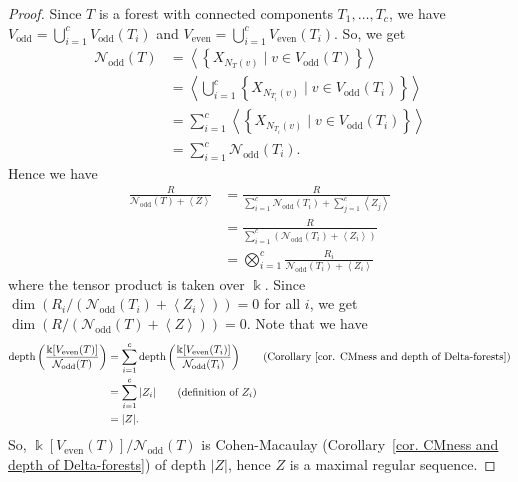 \documentclass[12pt, reqno]{amsart}
\theoremstyle{definition}
\theoremstyle{plain}
\theoremstyle{definition}
\newcommand{\depth}{\mbox{depth}}
\newcommand{\kk}{\Bbbk}
\newcommand\gen[1]{\left\langle #1 \right\rangle}
\newcommand\Set[2]{\left\lbrace #1 \mid #2 \right\rbrace}
\newcommand{\NN}{\mathcal{N}}
\begin{document}
\begin{proof}
Since $T$ is a forest with connected components $T_1,\dots,T_c$, we have $V_{\text{odd}} = \bigcup_{i = 1}^c V_{\text{odd}}(T_i)$ and $V_{\text{even}} = \bigcup_{i = 1}^c V_{\text{even}}(T_i)$.
So, we get
\begin{align*}
    \NN_{\text{odd}}(T) &= \gen{\Set{X_{N_T(v)}}{v \in V_{\text{odd}}(T)}}\\
    &= \gen{\bigcup_{i = 1}^c \Set{X_{N_{T_i}(v)}}{v \in V_{\text{odd}}(T_i)}}\\
    &= \sum_{i = 1}^c \gen{\Set{X_{N_{T_i}(v)}}{v \in V_{\text{odd}}(T_i)}}\\
    &= \sum_{i = 1}^c \NN_{\text{odd}}(T_i).
\end{align*}
Hence we have
\begin{align*}
    \frac{R}{\NN_{\text{odd}}(T)+\gen{Z}} &= \frac{R}{\sum_{i = 1}^c \NN_{\text{odd}}(T_i)+\sum_{j = 1}^c \gen{Z_j}}\\
    &= \frac{R}{\sum_{i = 1}^c \left(\NN_{\text{odd}}(T_i) + \gen{Z_i} \right)}\\
    &= \bigotimes_{i = 1}^c \frac{R_i}{\NN_{\text{odd}}(T_i) + \gen{Z_i}} 
\end{align*}
where the tensor product is taken over $\kk$.
Since $\dim\left(R_i/(\NN_{\text{odd}}(T_i) + \gen{Z_i})\right) = 0$ for all $i$, we get $\dim(R/(\NN_{\text{odd}}(T) + \gen{Z})) = 0$.
Note that we have
\begin{align*}
    \depth\left(\frac{\kk[V_{\text{even}}(T)]}{\NN_{\text{odd}}(T)}\right) &= \sum_{i = 1}^c\depth\left(\frac{\kk[V_{\text{even}}(T_i)]}{\NN_{\text{odd}}(T_i)}\right) \tag{Corollary~\ref{cor. CMness and depth of Delta-forests}}\\
    &= \sum_{i = 1}^c |Z_i| \tag{definition of $Z_i$}\\
    &= |Z|.
\end{align*}
So, $\kk[V_{\text{even}}(T)]/\NN_{\text{odd}}(T)$ is Cohen-Macaulay (Corollary~\ref{cor. CMness and depth of Delta-forests}) of depth $|Z|$, hence $Z$ is a maximal regular sequence.


\end{proof}
\end{document}

